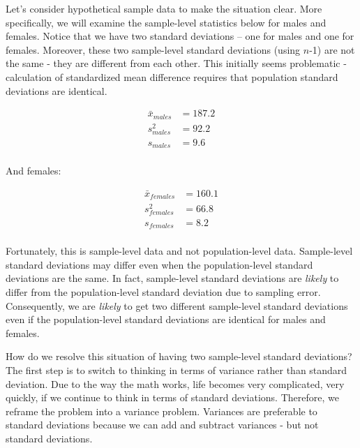 \documentclass[
]{krantz}
\begin{document}
Let's consider hypothetical sample data to make the situation clear. More specifically, we will examine the sample-level statistics below for males and females. Notice that we have two standard deviations -- one for males and one for females. Moreover, these two sample-level standard deviations (using \(n\)-1) are not the same - they are different from each other. This initially seems problematic - calculation of standardized mean difference requires that population standard deviations are identical.

\[
\begin{aligned} 
\bar{x}_{males} &= 187.2 \\
s_{males}^2 &= 92.2 \\
s_{males} &= 9.6 \\
\end{aligned} 
\]

And females:

\[
\begin{aligned} 
\bar{x}_{females} &= 160.1 \\
s_{females}^2 &= 66.8 \\
s_{females} &= 8.2 \\
\end{aligned} 
\]

Fortunately, this is sample-level data and not population-level data. Sample-level standard deviations may differ even when the population-level standard deviations are the same. In fact, sample-level standard deviations are \emph{likely} to differ from the population-level standard deviation due to sampling error. Consequently, we are \emph{likely} to get two different sample-level standard deviations even if the population-level standard deviations are identical for males and females.

How do we resolve this situation of having two sample-level standard deviations? The first step is to switch to thinking in terms of variance rather than standard deviation. Due to the way the math works, life becomes very complicated, very quickly, if we continue to think in terms of standard deviations. Therefore, we reframe the problem into a variance problem. Variances are preferable to standard deviations because we can add and subtract variances - but not standard deviations.
\end{document}
